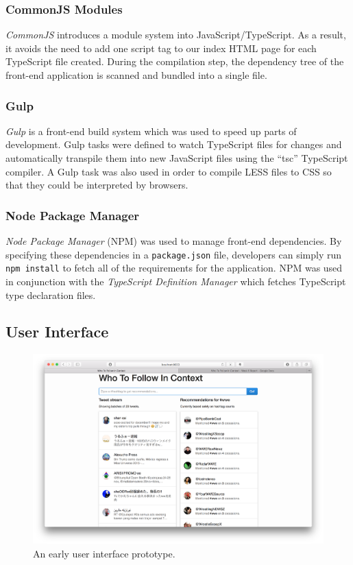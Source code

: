 \documentclass{l4proj}
\newcommand{\code}[1]{\texttt{#1}}
\begin{document}
        \subsubsection{CommonJS Modules}
        \textit{CommonJS} introduces a module system into JavaScript/TypeScript. As a result, it avoids the need to add one script tag to our index HTML page for each TypeScript file created. During the compilation step, the dependency tree of the front-end application is scanned and bundled into a single file.

        \subsubsection{Gulp}
        \textit{Gulp} is a front-end build system which was used to speed up parts of development. Gulp tasks were defined to watch TypeScript files for changes and automatically transpile them into new JavaScript files using the ``tsc'' TypeScript compiler. A Gulp task was also used in order to compile LESS files to CSS so that they could be interpreted by browsers.
        
        \subsubsection{Node Package Manager}
        \textit{Node Package Manager} (NPM) was used to manage front-end dependencies. By specifying these dependencies in a \code{package.json} file, developers can simply run \code{npm install} to fetch all of the requirements for the application. NPM was used in conjunction with the \textit{TypeScript Definition Manager} which fetches TypeScript type declaration files.
        
        \subsection{User Interface}
\begin{figure}
\centering
\includegraphics[scale=0.24]{initialui.png}
\caption{An early user interface prototype.}
\label{initialui}
\end{figure} 
        
\end{document}
